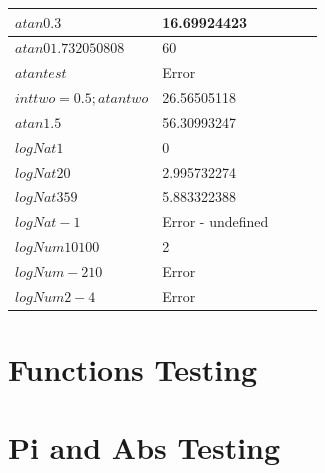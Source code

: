 \documentclass[a4paper, oneside, 11pt]{report}
\begin{document}
\begin{table}[h]
\begin{tabular}{|l|l|l|l|l|}
\hline
$ atan 0.3$               & 16.69924423                     &      &           &                 \\ 
\hline
$ atan 01.732050808$      & 60                              &      &           &                 \\ 
\hline
$ atan test$              & Error                           &      &           &                 \\ 
\hline
$int two = 0.5; atan two$ & 26.56505118                     &      &           &                 \\ 
\hline
$ atan 1.5$               & 56.30993247                     &      &           &                 \\ 
\hline
$ logNat 1$               & 0                               &      &           &                 \\ 
\hline
$ logNat 20$              & 2.995732274                     &      &           &                 \\ 
\hline
$ logNat 359$             & 5.883322388                     &      &           &                 \\ 
\hline
$ logNat -1$              & Error - undefined               &      &           &                 \\ 
\hline
$ logNum 10 100$          & 2                               &      &           &                 \\ 
\hline
$ logNum -2 10$           & Error                           &      &           &                 \\ 
\hline
$ logNum 2 -4$            & Error                           &      &           &                 \\
\hline
\end{tabular}
\end{table}

\section{Functions Testing}\label{FuncTest}
\section{Pi and Abs Testing}\label{PiTest}
\end{document}
